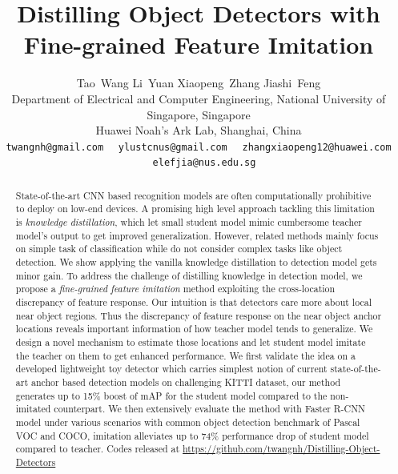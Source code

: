 \documentclass[10pt,twocolumn,letterpaper]{article}
\begin{document}
\graphicspath{{pictures/}}
\title{Distilling Object Detectors with Fine-grained Feature Imitation}

\author{\normalsize{Tao~Wang} \qquad \quad  \normalsize{Li~Yuan}  \quad  \qquad \normalsize{Xiaopeng~Zhang}  \quad  \qquad \normalsize{Jiashi~Feng}\\
	\small{Department of Electrical and Computer Engineering, National University of Singapore, Singapore} \\
	\small{Huawei Noah's Ark Lab, Shanghai, China} \\
	{\small \tt twangnh@gmail.com}  \ \  {\small \tt ylustcnus@gmail.com}  \ \ {\small\tt zhangxiaopeng12@huawei.com} \ \ {\small\tt elefjia@nus.edu.sg}
}

\maketitle
\thispagestyle{empty}



\begin{abstract}	


State-of-the-art CNN based recognition models are often computationally prohibitive to deploy on low-end devices. A promising high level approach tackling this limitation is \emph{knowledge distillation}, which let small student model mimic cumbersome teacher model's output to get improved generalization. However, related methods mainly focus on simple task of classification while do not consider complex tasks like object detection. We show applying the vanilla knowledge distillation to detection model gets minor gain.  To address the challenge of distilling knowledge in detection model, we propose a \emph{fine-grained feature imitation} method exploiting the cross-location discrepancy of feature response. Our intuition is that detectors care more about local near object regions. Thus the discrepancy of feature response on the near object anchor locations reveals important information of how teacher model tends to generalize. We design a novel mechanism to estimate those locations and let student model imitate the teacher on them to get enhanced performance. We first validate the idea on a developed lightweight toy detector which carries simplest notion of current state-of-the-art anchor based detection models on challenging KITTI dataset, our method generates up to 15\% boost of mAP for the student model compared to the non-imitated counterpart. We then extensively evaluate the method with Faster R-CNN model under various scenarios with common object detection benchmark of Pascal VOC and COCO, imitation alleviates up to 74\% performance drop of student model compared to teacher. Codes released at \url{https://github.com/twangnh/Distilling-Object-Detectors}
\end{abstract}
\end{document}
